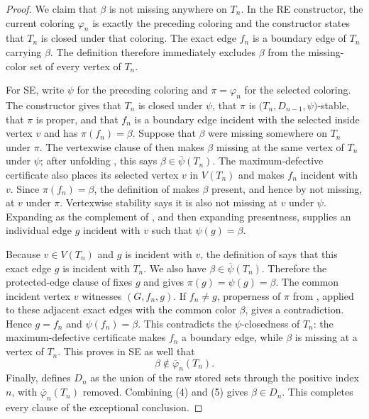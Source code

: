 \begin{proof}
We claim that $\beta$ is not missing anywhere on $T_n$.  In the RE
constructor, the current coloring $\varphi_n$ is exactly the preceding
coloring and the constructor states that $T_n$ is closed under that
coloring.  The exact edge $f_n$ is a boundary edge of $T_n$ carrying
$\beta$.  The definition  therefore
immediately excludes $\beta$ from the missing-color set of every vertex
of $T_n$.

For SE, write $\psi$ for the preceding coloring and $\pi=\varphi_n$ for
the selected coloring.  The constructor gives that $T_n$ is closed under
$\psi$, that $\pi$ is
$\bigl(T_n,D_{n-1},\psi\bigr)$-stable, that $\pi$ is proper, and that
$f_n$ is a boundary edge incident with the selected inside vertex $v$
and has $\pi(f_n)=\beta$.  Suppose that $\beta$ were missing somewhere
on $T_n$ under $\pi$.  The vertexwise clause of
 then makes $\beta$ missing at the same vertex
of $T_n$ under $\psi$; after unfolding , this
says $\beta\in\overline\psi(T_n)$.  The maximum-defective certificate
also places its selected vertex $v$ in $V(T_n)$ and makes $f_n$ incident
with $v$.  Since $\pi(f_n)=\beta$, the definition of
 makes $\beta$ present, and hence by
 not missing, at $v$ under $\pi$.  Vertexwise
stability says it is also not missing at $v$ under $\psi$.  Expanding
 as the complement of
, and then expanding presentness, supplies an
individual edge $g$ incident with $v$ such that $\psi(g)=\beta$.

Because $v\in V(T_n)$ and $g$ is incident with $v$, the definition of
 says that this exact edge $g$ is incident with
$T_n$.  We also have $\beta\in\overline\psi(T_n)$.  Therefore the
protected-edge clause of  fixes $g$ and gives
$\pi(g)=\psi(g)=\beta$.  The common incident vertex $v$ witnesses
$(G,f_n,g)$.  If $f_n\ne g$, properness of $\pi$
from , applied to these adjacent exact
edges with the common color $\beta$, gives a contradiction.  Hence
$g=f_n$ and $\psi(f_n)=\beta$.  This contradicts the
$\psi$-closedness of $T_n$: the maximum-defective certificate makes
$f_n$ a boundary edge, while $\beta$ is missing at a vertex of $T_n$.
This proves in SE as well that
\[
                    \beta\notin\overline\varphi_n(T_n).        \tag{5}
\]
Finally,  defines $D_n$ as the union of
the raw stored sets through the positive index $n$, with
$\overline\varphi_n(T_n)$ removed.  Combining (4) and (5) gives
$\beta\in D_n$.  This completes every clause of the exceptional
conclusion.
\end{proof}
